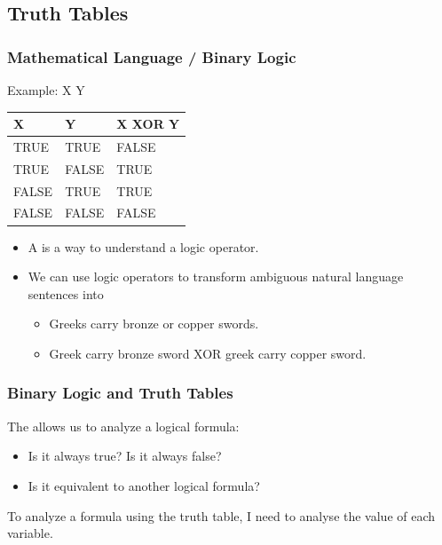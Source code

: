 \documentclass{beamer}
\begin{document}
\subsection{Truth Tables}
\begin{frame}
  \frametitle{Mathematical Language / Binary Logic}

  Example: X  Y

  \bigskip

  \begin{tabular}{ll|l}
    X & Y & X XOR Y\\
    \hline
    TRUE & TRUE & FALSE\\
    TRUE & FALSE & TRUE\\
    FALSE & TRUE & TRUE\\
    FALSE & FALSE & FALSE\\
  \end{tabular}

  \bigskip

  \begin{itemize}
  \item A  is a way to understand a logic
    operator.
  \item We can use logic operators to transform \alert{ambiguous natural
    language sentences} into 
    \begin{itemize}
    \item Greeks carry bronze or copper swords.
    \item Greek carry bronze sword XOR greek carry copper sword.
    \end{itemize}
  \end{itemize}
\end{frame}

\begin{frame}
  \frametitle{Binary Logic and Truth Tables}

  The  allows us to analyze a logical formula:

  \bigskip

  \begin{itemize}
  \item Is it always true? Is it always false?
  \item Is it equivalent to another logical formula?
  \end{itemize}

  To analyze a formula using the truth table, I need to analyse the
  value of each variable.
\end{frame}
\end{document}
